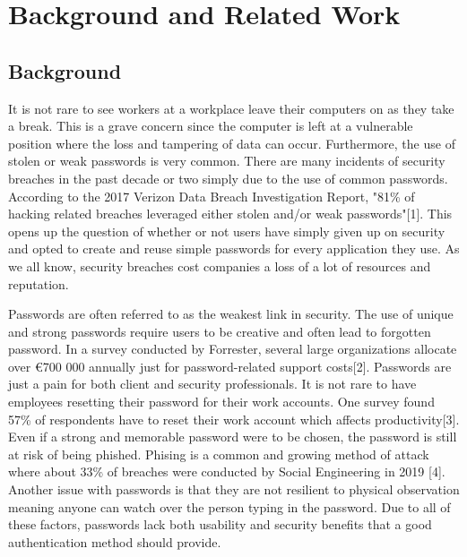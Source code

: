 \documentclass[letterpaper,twocolumn,10pt]{article}
\begin{document}

\section{Background and Related Work}  

\subsection{Background}

It is not rare to see workers at a workplace leave their computers on as they take a break. This is a grave concern since the computer is left at a vulnerable position where the loss and tampering of data can occur. Furthermore, the use of stolen or weak passwords is very common. There are many incidents of security breaches in the past decade or two simply due to the use of common passwords. According to the 2017 Verizon Data Breach Investigation Report, "81\% of hacking related breaches leveraged either stolen and/or weak passwords"[1]. This opens up the question of whether or not users have simply given up on security and opted to create and reuse simple passwords for every application they use. As we all know, security breaches cost companies a loss of a lot of resources and reputation.

Passwords are often referred to as the weakest link in security. The use of unique and strong passwords require users to be creative and often lead to forgotten password. In a survey conducted by Forrester, several large organizations allocate over \euro{700 000} annually just for password-related support costs[2]. Passwords are just a pain for both client and security professionals. It is not rare to have employees resetting their password for their work accounts. One survey found 57\% of respondents have to reset their work account which affects productivity[3]. Even if a strong and memorable password were to be chosen, the password is still at risk of being phished. Phising is a common and growing method of attack where about 33\% of breaches were conducted by Social Engineering in 2019 [4]. Another issue with passwords is that they are not resilient to physical observation meaning anyone can watch over the person typing in the password. Due to all of these factors, passwords lack both usability and security benefits that a good authentication method should provide.
\end{document}
